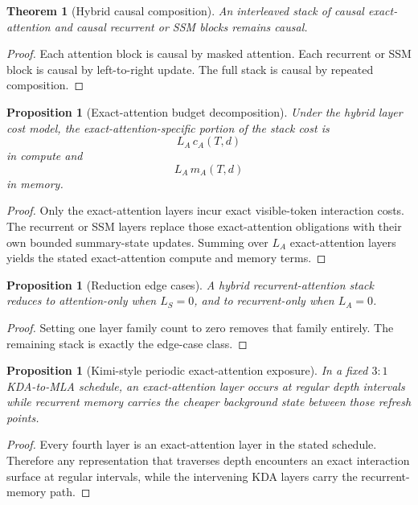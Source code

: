 \documentclass[11pt]{article}
\newtheorem{theorem}[definition]{Theorem}
\newtheorem{proposition}[definition]{Proposition}
\begin{document}
\begin{theorem}[Hybrid causal composition]
An interleaved stack of causal exact-attention and causal recurrent or SSM
blocks remains causal.
\end{theorem}

\begin{proof}
Each attention block is causal by masked attention. Each recurrent or SSM block
is causal by left-to-right update. The full stack is causal by repeated
composition.
\end{proof}

\begin{proposition}[Exact-attention budget decomposition]
Under the hybrid layer cost model, the exact-attention-specific portion of the
stack cost is
\[
  L_A \, c_A(T, d)
\]
in compute and
\[
  L_A \, m_A(T, d)
\]
in memory.
\end{proposition}

\begin{proof}
Only the exact-attention layers incur exact visible-token interaction costs.
The recurrent or SSM layers replace those exact-attention obligations with
their own bounded summary-state updates. Summing over $L_A$ exact-attention
layers yields the stated exact-attention compute and memory terms.
\end{proof}

\begin{proposition}[Reduction edge cases]
A hybrid recurrent-attention stack reduces to attention-only when $L_S = 0$,
and to recurrent-only when $L_A = 0$.
\end{proposition}

\begin{proof}
Setting one layer family count to zero removes that family entirely. The
remaining stack is exactly the edge-case class.
\end{proof}

\begin{proposition}[Kimi-style periodic exact-attention exposure]
In a fixed $3{:}1$ KDA-to-MLA schedule, an exact-attention layer occurs at
regular depth intervals while recurrent memory carries the cheaper background
state between those refresh points.
\end{proposition}

\begin{proof}
Every fourth layer is an exact-attention layer in the stated schedule.
Therefore any representation that traverses depth encounters an exact
interaction surface at regular intervals, while the intervening KDA layers
carry the recurrent-memory path.
\end{proof}
\end{document}
